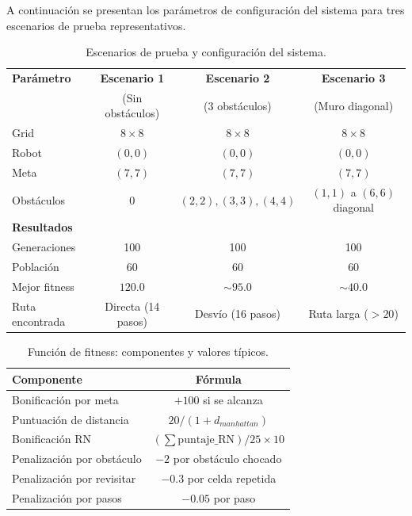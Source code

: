 \documentclass[12pt,a4paper]{article}
\begin{document}
A continuaci\'on se presentan los par\'ametros de configuraci\'on del sistema para tres escenarios de prueba representativos.

\begin{table}[H]
\centering
\caption{Escenarios de prueba y configuraci\'on del sistema.}
\label{tab:params}
\small
\begin{tabular}{l c c c}
\toprule
\textbf{Par\'ametro} & \textbf{Escenario 1} & \textbf{Escenario 2} & \textbf{Escenario 3} \\
                       & (Sin obst\'aculos) & (3 obst\'aculos) & (Muro diagonal) \\
\midrule
Grid & $8 \times 8$ & $8 \times 8$ & $8 \times 8$ \\
Robot & $(0,0)$ & $(0,0)$ & $(0,0)$ \\
Meta & $(7,7)$ & $(7,7)$ & $(7,7)$ \\
Obst\'aculos & 0 & $(2,2), (3,3), (4,4)$ & $(1,1)$ a $(6,6)$ diagonal \\
\midrule
\textbf{Resultados} \\
Generaciones & 100 & 100 & 100 \\
Poblaci\'on & 60 & 60 & 60 \\
Mejor fitness & $120.0$ & $\sim 95.0$ & $\sim 40.0$ \\
Ruta encontrada & Directa (14 pasos) & Desv\'io (16 pasos) & Ruta larga ($>20$) \\
\bottomrule
\end{tabular}
\end{table}

\begin{table}[H]
\centering
\caption{Funci\'on de fitness: componentes y valores t\'ipicos.}
\label{tab:fitness}
\begin{tabular}{l c}
\toprule
\textbf{Componente} & \textbf{F\'ormula} \\
\midrule
Bonificaci\'on por meta & $+100$ si se alcanza \\
Puntuaci\'on de distancia & $20 / (1 + d_{manhattan})$ \\
Bonificaci\'on RN & $(\sum \text{puntaje\_RN}) / 25 \times 10$ \\
Penalizaci\'on por obst\'aculo & $-2$ por obst\'aculo chocado \\
Penalizaci\'on por revisitar & $-0.3$ por celda repetida \\
Penalizaci\'on por pasos & $-0.05$ por paso \\
\bottomrule
\end{tabular}
\end{table}
\end{document}
